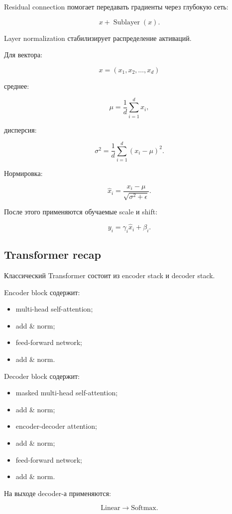 \documentclass[a4paper,12pt]{article}
\begin{document}
Residual connection помогает передавать градиенты через глубокую сеть:

\[
x + \operatorname{Sublayer}(x).
\]

Layer normalization стабилизирует распределение активаций.

Для вектора:

\[
x = (x_1, x_2, \dots, x_d)
\]

среднее:

\[
\mu =
\frac{1}{d}
\sum_{i=1}^{d} x_i,
\]

дисперсия:

\[
\sigma^2 =
\frac{1}{d}
\sum_{i=1}^{d}
(x_i-\mu)^2.
\]

Нормировка:

\[
\hat{x}_i =
\frac{x_i-\mu}
{\sqrt{\sigma^2+\epsilon}}.
\]

После этого применяются обучаемые scale и shift:

\[
y_i = \gamma_i \hat{x}_i + \beta_i.
\]

\subsection{Transformer recap}

Классический Transformer состоит из encoder stack и decoder stack.

Encoder block содержит:

\begin{itemize}
    \item multi-head self-attention;
    \item add \& norm;
    \item feed-forward network;
    \item add \& norm.
\end{itemize}

Decoder block содержит:

\begin{itemize}
    \item masked multi-head self-attention;
    \item add \& norm;
    \item encoder-decoder attention;
    \item add \& norm;
    \item feed-forward network;
    \item add \& norm.
\end{itemize}

На выходе decoder-а применяются:

\[
\text{Linear} \rightarrow \text{Softmax}.
\]
\end{document}
